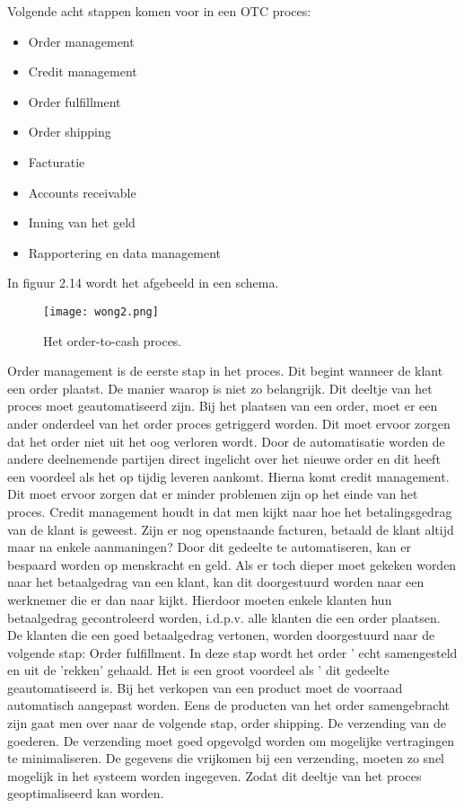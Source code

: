 Volgende acht stappen komen voor in een OTC proces:
\begin{itemize}
	\item Order management
	\item Credit management
	\item Order fulfillment
	\item Order shipping
	\item Facturatie
	\item Accounts receivable
	\item Inning van het geld
	\item Rapportering en data management
\end{itemize}
In figuur 2.14 wordt het afgebeeld in een schema.
\begin{figure}[h]
	\texttt{[image: wong2.png]}
	\caption{Het order-to-cash proces. \textcite{Wong2018}}
	\centering
\end{figure}
Order management is de eerste stap in het proces. Dit begint wanneer de klant een order plaatst. De manier waarop is niet zo belangrijk. Dit deeltje van het proces moet geautomatiseerd zijn. Bij het plaatsen van een order, moet er een ander onderdeel van het order proces getriggerd worden. Dit moet ervoor zorgen dat het order niet uit het oog verloren wordt. Door de automatisatie worden de andere deelnemende partijen direct ingelicht over het nieuwe  order en dit heeft een voordeel als het op tijdig leveren aankomt.
Hierna komt credit management. Dit moet ervoor zorgen dat er minder problemen zijn op het einde van het proces. Credit management houdt in dat men kijkt naar hoe het betalingsgedrag van de klant is geweest. Zijn er nog openstaande facturen, betaald de klant altijd maar na enkele aanmaningen? Door dit gedeelte te automatiseren, kan er bespaard worden op menskracht en geld. Als er toch dieper moet gekeken worden naar het betaalgedrag van een klant, kan dit doorgestuurd worden naar een  werknemer die er dan naar kijkt. Hierdoor moeten enkele klanten hun betaalgedrag gecontroleerd worden, i.d.p.v. alle klanten die een order plaatsen. 
De klanten die een goed betaalgedrag vertonen, worden doorgestuurd naar de volgende stap: Order fulfillment. In deze stap wordt het order ' echt samengesteld en uit de 'rekken' gehaald. Het is een groot voordeel als ' dit gedeelte geautomatiseerd is. Bij het verkopen van een product moet de voorraad automatisch aangepast worden. Eens de producten van het order samengebracht zijn gaat  men  over naar de volgende stap, order shipping. De verzending van de goederen. De verzending moet goed opgevolgd worden om mogelijke vertragingen te minimaliseren. De gegevens die vrijkomen bij een verzending, moeten zo snel mogelijk in het systeem worden ingegeven. Zodat dit deeltje van het proces geoptimaliseerd kan worden. 
